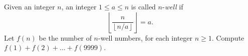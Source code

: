 Given an integer $n$, an integer $1 \le a \le n$ is called $n$-\emph{well} if \[ \left\lfloor\frac{n}{\left\lfloor n/a \right\rfloor}\right\rfloor = a. \] Let $f(n)$ be the number of $n$-well numbers, for each integer $n \ge 1$. Compute $f(1) + f(2) + \ldots + f(9999)$.
